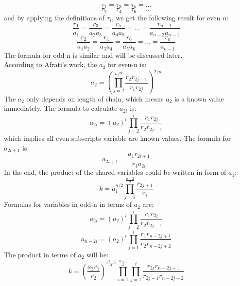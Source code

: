 $$\tau_1 = \tau_3 = \tau_5 = ...$$
$$\tau_2 = \tau_4 = \tau_6 = ...$$
and by applying the definitions of $\tau_i$, we get the following result for even $n$:
$$\frac{r_1}{a_1} = \frac{r_3}{a_2a_3} = \frac{r_5}{a_4a_5} = ... = \frac{r_{n-1}}{a_{n-2}a_{n-1}}$$
$$\frac{r_2}{a_1a_2} = \frac{r_4}{a_3a_4} = \frac{r_6}{a_5a_6} = ... = \frac{r_{n}}{a_{n-1}}$$
The formula for odd n is similar and will be discussed later.\\
According to Afrati's work\cite{afrati2010optimizing}, the $a_2$ for even-n is:
$$a_2 = (\prod_{j=2}^{n/2}\frac{r_2r_{2j-1}}{r_1r_{2j}})^{2/n}$$
The $a_2$ only depends on length of chain, which means $a_2$ is a known value immediately. The formula to calculate $a_{2i}$ is:
$$a_{2i} = (a_2)^i\prod_{j=2}^i\frac{r_1r_{2j}}{r_2r_{2j-1}}$$
which implies all even subscripts variable are known values. The formula for $a_{2i+1}$ is:
$$a_{2i+1} = \frac{a_1r_{2i+1}}{r_1a_{2i}}$$
In the end, the product of the shared variables could be written in form of $a_1$:
$$k = a_1^{n/2}\prod_{j=1}^{\frac{n-2}{2}}\frac{r_{2j+1}}{r_1}$$
Formulas for variables in odd-n in terms of $a_2$ are:
$$a_{2i} = (a_2)^i\prod_{j=2}^i\frac{r_1r_{2j}}{r_2r_{2j-1}}$$
$$a_{n-2i} = (a_2)^i\prod_{j=1}^i\frac{r_1r_{n-2j+1}}{r_2r_{n-2j+2}}$$
The product in terms of $a_2$ will be:
$$k = (\frac{a_2r_1}{r_2})^{\frac{n^2-1}{4}}\prod_{i=1}^{\frac{n-1}{2}}\prod_{j=1}^{i}\frac{r_{2j}r_{n-2j+1}}{r_{2j-1}r_{n-2j+2}}$$

